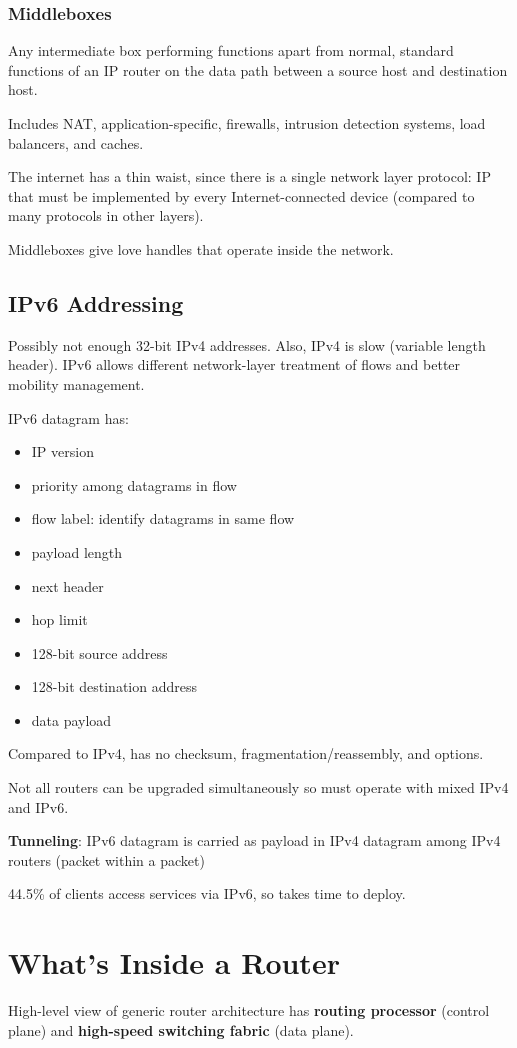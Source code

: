 \documentclass[11pt]{article}
\begin{document}
\subsubsection{Middleboxes}
\label{sec:org6634835}
Any intermediate box performing functions apart from normal, standard functions
of an IP router on the data path between a source host and destination host.

Includes NAT, application-specific, firewalls, intrusion detection systems,
load balancers, and caches.

The internet has a thin waist, since there is a single network layer protocol: IP
that must be implemented by every Internet-connected device (compared to
many protocols in other layers).

Middleboxes give love handles that operate inside the network.
\subsection{IPv6 Addressing}
\label{sec:org37a52bc}
Possibly not enough 32-bit IPv4 addresses. Also, IPv4 is slow (variable length header).
IPv6 allows different network-layer treatment of flows and better mobility management.

IPv6 datagram has:
\begin{itemize}
\item IP version
\item priority among datagrams in flow
\item flow label: identify datagrams in same flow
\item payload length
\item next header
\item hop limit
\item 128-bit source address
\item 128-bit destination address
\item data payload
\end{itemize}

Compared to IPv4, has no checksum, fragmentation/reassembly, and options.

Not all routers can be upgraded simultaneously so must operate with mixed IPv4
and IPv6.

\textbf{Tunneling}: IPv6 datagram is carried as payload in IPv4 datagram among IPv4
routers (packet within a packet)

44.5\% of clients access services via IPv6, so takes time to deploy.
\section{What's Inside a Router}
\label{sec:org48e3b43}
High-level view of generic router architecture has \textbf{routing processor} (control plane) and
\textbf{high-speed switching fabric} (data plane).
\end{document}
